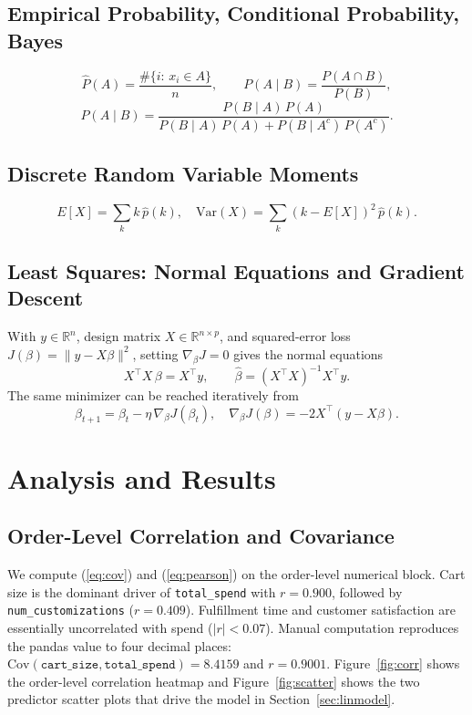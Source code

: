 \documentclass[conference,10pt]{IEEEtran}
\begin{document}
\subsection{Empirical Probability, Conditional Probability, Bayes}
\begin{equation}
\hat{P}(A) = \frac{\#\{i:\,x_i \in A\}}{n}, \qquad
P(A\mid B) = \frac{P(A\cap B)}{P(B)},
\label{eq:emp}
\end{equation}
\begin{equation}
P(A\mid B) = \frac{P(B\mid A)\,P(A)}{P(B\mid A)\,P(A) + P(B\mid A^c)\,P(A^c)}.
\label{eq:bayes}
\end{equation}

\subsection{Discrete Random Variable Moments}
\begin{equation}
E[X] = \sum_k k\,\hat{p}(k), \quad
\mathrm{Var}(X) = \sum_k (k-E[X])^2\,\hat{p}(k).
\label{eq:rv}
\end{equation}

\subsection{Least Squares: Normal Equations and Gradient Descent}
With $y\in\mathbb{R}^n$, design matrix $X\in\mathbb{R}^{n\times p}$, and squared\nobreakdash-error loss
$J(\beta)=\|y-X\beta\|^2$, setting $\nabla_\beta J=0$ gives the normal equations
\begin{equation}
X^{\top}X\,\beta = X^{\top}y,\qquad \hat{\beta}=(X^{\top}X)^{-1}X^{\top}y.
\label{eq:normal}
\end{equation}
The same minimizer can be reached iteratively from
\begin{equation}
\beta_{t+1} = \beta_t - \eta\,\nabla_\beta J(\beta_t),
\quad \nabla_\beta J(\beta) = -2 X^{\top}(y-X\beta).
\label{eq:gd}
\end{equation}

\section{Analysis and Results}

\subsection{Order-Level Correlation and Covariance}
We compute (\ref{eq:cov}) and (\ref{eq:pearson}) on the order\nobreakdash-level numerical block. Cart size is the dominant driver of \texttt{total\_spend} with $r=0.900$, followed by \texttt{num\_customizations} ($r=0.409$). Fulfillment time and customer satisfaction are essentially uncorrelated with spend ($|r|<0.07$). Manual computation reproduces the pandas value to four decimal places: $\mathrm{Cov}(\texttt{cart\_size},\texttt{total\_spend})=8.4159$ and $r=0.9001$. Figure~\ref{fig:corr} shows the order\nobreakdash-level correlation heatmap and Figure~\ref{fig:scatter} shows the two predictor scatter plots that drive the model in Section~\ref{sec:linmodel}.
\end{document}
